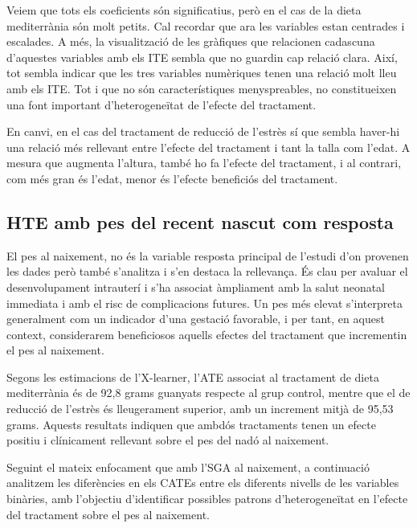 \documentclass[../main.tex]{subfiles}
\begin{document}
    Veiem que tots els coeficients són significatius, però en el cas de la dieta mediterrània són molt petits. Cal recordar que ara les variables estan centrades i escalades. A més, la visualització de les gràfiques que relacionen cadascuna d’aquestes variables amb els ITE sembla que no guardin cap relació clara. Així, tot sembla indicar que les tres variables numèriques tenen una relació molt lleu amb els ITE. Tot i que no són característiques menyspreables, no constitueixen una font important d’heterogeneïtat de l’efecte del tractament.\par
    En canvi, en el cas del tractament de reducció de l’estrès sí que sembla haver-hi una relació més rellevant entre l’efecte del tractament i tant la talla com l’edat. A mesura que augmenta l’altura, també ho fa l’efecte del tractament, i al contrari, com més gran és l’edat, menor és l’efecte beneficiós del tractament.\par
    
    
    




    \subsection{HTE amb pes del recent nascut com resposta}
    \label{subsec:profund_pes}
    El pes al naixement, no és la variable resposta principal de l'estudi d'on provenen les dades però també s'analitza i s'en destaca la rellevança. És clau per avaluar el desenvolupament intrauterí i s’ha associat àmpliament amb la salut neonatal immediata i amb el risc de complicacions futures. Un pes més elevat s’interpreta generalment com un indicador d’una gestació favorable, i per tant, en aquest context, considerarem beneficiosos aquells efectes del tractament que incrementin el pes al naixement.\par
    Segons les estimacions de l’X-learner, l’ATE associat al tractament de dieta mediterrània és de 92,8 grams guanyats respecte al grup control, mentre que el de reducció de l’estrès és lleugerament superior, amb un increment mitjà de 95,53 grams. Aquests resultats indiquen que ambdós tractaments tenen un efecte positiu i clínicament rellevant sobre el pes del nadó al naixement.\par
    Seguint el mateix enfocament que amb l’SGA al naixement, a continuació analitzem les diferències en els CATEs entre els diferents nivells de les variables binàries, amb l’objectiu d’identificar possibles patrons d’heterogeneïtat en l’efecte del tractament sobre el pes al naixement.
\end{document}

